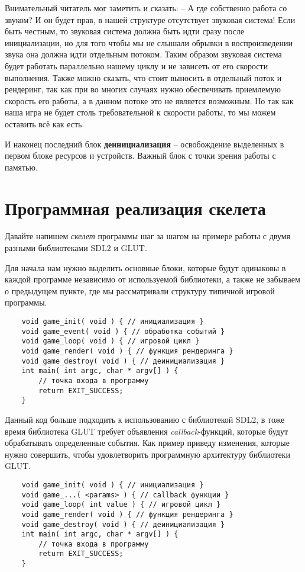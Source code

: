 Внимательный читатель мог заметить и сказать: -- А где собственно работа со звуком? И он будет прав, в нашей 
структуре отсутствует звуковая система! Если быть честным, то звуковая система должна быть идти сразу после 
инициализации, но для того чтобы мы не слышали обрывки в воспроизведении звука она должна идти отдельным 
потоком. Таким образом звуковая система будет работать параллельно нашему циклу и не зависеть от его скорости 
выполнения. Также можно сказать, что стоит выносить в отдельный поток и рендеринг, так как при во многих 
случаях нужно обеспечивать приемлемую скорость его работы, а в данном потоке это не является возможным. 
Но так как наша игра не будет столь требовательной к скорости работы, то мы можем оставить всё как есть.

И наконец последний блок \textbf{деинициализация} -- освобождение выделенных в первом блоке ресурсов и 
устройств. Важный блок с точки зрения работы с памятью.

\section{Программная реализация скелета}
Давайте напишем \emph{скелет} программы шаг за шагом на примере работы с двумя разными библиотеками 
SDL2 и GLUT.

Для начала нам нужно выделить основные блоки, которые будут одинаковы в каждой программе независимо от 
используемой библиотеки, а также не забываем о предыдущем пункте, где мы рассматривали структуру типичной 
игровой программы.

\begin{lstlisting}
    void game_init( void ) { // инициализация }
    void game_event( void ) { // обработка событий }
    void game_loop( void ) { // игровой цикл }
    void game_render( void ) { // функция рендеринга }
    void game_destroy( void ) { // деинициализация }
    int main( int argc, char * argv[] ) {
        // точка входа в программу
        return EXIT_SUCCESS;
    }
\end{lstlisting}

Данный код больше подходить к использованию с библиотекой SDL2, в тоже время библиотека GLUT требует 
объявления \emph{callback}-функций, которые будут обрабатывать определенные события. Как пример приведу 
изменения, которые нужно совершить, чтобы удовлетворить программную архитектуру библиотеки GLUT.
\begin{lstlisting}
    void game_init( void ) { // инициализация }
    void game_...( <params> ) { // callback функции }
    void game_loop( int value ) { // игровой цикл }
    void game_render( void ) { // функция рендеринга }
    void game_destroy( void ) { // деинициализация }
    int main( int argc, char * argv[] ) {
        // точка входа в программу
        return EXIT_SUCCESS;
    }
\end{lstlisting}

